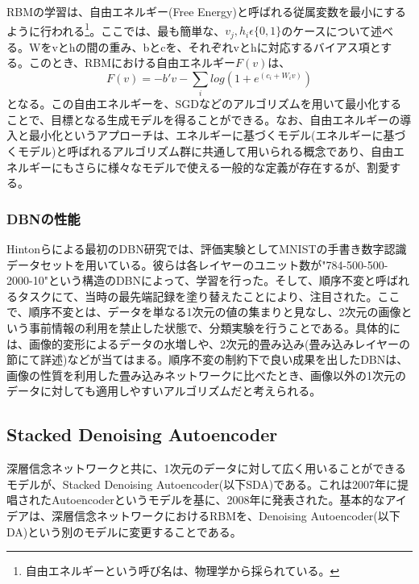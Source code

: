 RBMの学習は、自由エネルギー(Free Energy)と呼ばれる従属変数を最小にするように行われる\footnote{自由エネルギーという呼び名は、物理学から採られている。}。ここでは、最も簡単な、$v_j, h_i\epsilon\{0,1\}$のケースについて述べる。Wをvとhの間の重み、bとcを、それぞれvとhに対応するバイアス項とする。このとき、RBMにおける自由エネルギー$F(v)$は、
\begin{equation}
F(v) = -b' v-\sum_{i}log(1+e^{(c_i+W_{i}v)})
\end{equation}
となる。この自由エネルギーを、SGDなどのアルゴリズムを用いて最小化することで、目標となる生成モデルを得ることができる。なお、自由エネルギーの導入と最小化というアプローチは、エネルギーに基づくモデル(エネルギーに基づくモデル)と呼ばれるアルゴリズム群に共通して用いられる概念であり、自由エネルギーにもさらに様々なモデルで使える一般的な定義が存在するが、割愛する。
\subsubsection{DBNの性能}
Hintonらによる最初のDBN研究では、評価実験としてMNISTの手書き数字認識データセットを用いている。彼らは各レイヤーのユニット数が"784-500-500-2000-10"という構造のDBNによって、学習を行った。そして、順序不変と呼ばれるタスクにて、当時の最先端記録を塗り替えたことにより、注目された。ここで、順序不変とは、データを単なる1次元の値の集まりと見なし、2次元の画像という事前情報の利用を禁止した状態で、分類実験を行うことである。具体的には、画像的変形によるデータの水増しや、2次元的畳み込み(畳み込みレイヤーの節にて詳述)などが当てはまる。順序不変の制約下で良い成果を出したDBNは、画像の性質を利用した畳み込みネットワークに比べたとき、画像以外の1次元のデータに対しても適用しやすいアルゴリズムだと考えられる。

\subsection{Stacked Denoising Autoencoder}
深層信念ネットワークと共に、1次元のデータに対して広く用いることができるモデルが、Stacked Denoising Autoencoder(以下SDA)である。これは2007年に提唱されたAutoencoder\cite{bengio2007greedy}というモデルを基に、2008年に発表された\cite{vincent2008extracting}。基本的なアイデアは、深層信念ネットワークにおけるRBMを、Denoising Autoencoder(以下DA)という別のモデルに変更することである。
